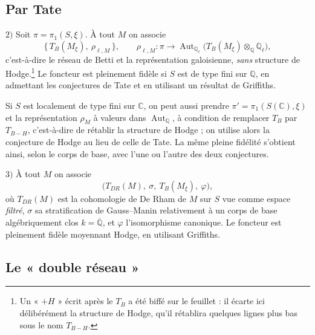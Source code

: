 \documentclass[11pt,a4paper]{article}
\begin{document}
\subsection*{Par Tate}

$2)$ Soit $\pi = \pi_{1}(S, \xi)$. À tout $M$ on associe
\[
\{\, T_{B}(M_{\xi}),\ \rho_{\ell, M} \,\} ,
\qquad
\rho_{\ell, M} : \pi \longrightarrow \operatorname{Aut}_{\mathbb{Q}_{\ell}}\bigl( T_{B}(M_{\xi}) \otimes_{\mathbb{Q}} \mathbb{Q}_{\ell} \bigr) ,
\]
c'est-à-dire le réseau de Betti et la représentation galoisienne, \emph{sans}
structure de Hodge.\footnote{Un « $+H$ » écrit après le $T_{B}$ a été biffé sur
le feuillet : il écarte ici délibérément la structure de Hodge, qu'il
rétablira quelques lignes plus bas sous le nom $T_{B-H}$.} Le foncteur est
pleinement fidèle si $S$ est de type fini sur $\mathbb{Q}$, en admettant les
conjectures de Tate et en utilisant un résultat de Griffiths.

Si $S$ est localement de type fini sur $\mathbb{C}$, on peut aussi prendre
$\pi' = \pi_{1}(S(\mathbb{C}), \xi)$ et la représentation $\rho_{M}$ à valeurs
dans $\operatorname{Aut}_{\mathbb{Q}}$, à condition de remplacer $T_{B}$ par
$T_{B-H}$, c'est-à-dire de rétablir la structure de Hodge ; on utilise alors la
conjecture de Hodge au lieu de celle de Tate. La même pleine fidélité s'obtient
ainsi, selon le corps de base, avec l'une ou l'autre des deux conjectures.

$3)$ À tout $M$ on associe
\[
\bigl( T_{DR}(M),\ \sigma,\ T_{B}(M_{\xi}),\ \varphi \bigr) ,
\]
où $T_{DR}(M)$ est la cohomologie de De Rham de $M$ sur $S$ vue comme espace
\emph{filtré}, $\sigma$ sa stratification de Gauss--Manin relativement à un corps
de base algébriquement clos $k = \overline{\mathbb{Q}}$, et $\varphi$
l'isomorphisme canonique. Le foncteur est pleinement fidèle moyennant Hodge, en
utilisant Griffiths.

\subsection*{Le « double réseau »}
\end{document}

